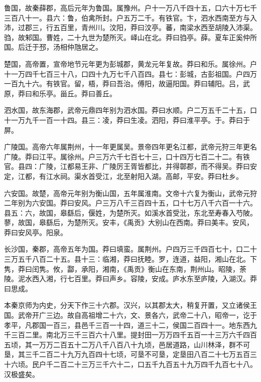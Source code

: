 \documentclass[12pt,UTF8]{ctexbook}
\begin{document}
鲁国，故秦薛郡，高后元年为鲁国。属豫州。户十一万八千四十五，口六十万七千三百八十一。县六：鲁，伯禽所封。户五万二千。有铁官。卞，泗水西南至方与入沛，过郡三，行五百里，青州川。汶阳，莽曰汶亭。蕃，南梁水西至胡陵入沛渠。驺，故邾国。曹姓，二十九世为楚所灭。峄山在北。莽曰驺亭。薛。夏车正奚仲所国。后迁于邳，汤相仲虺居之。



楚国，高帝置，宣帝地节元年更为彭城郡，黄龙元年复故。莽曰和乐。属徐州。户十一万四千七百三十八，口四十九万七千八百四。县七：彭城，古彭祖国。户四万一百九十六。有铁官。留，梧，莽曰吾治。傅阳，故逼阳国。莽曰辅阳。吕，武原，莽曰和乐亭。甾丘。莽曰善丘。



泗水国，故东海郡，武帝元鼎四年别为泗水国。莽曰水顺。户二万五千二十五，口十一万九千一百一十四。县三：凌，莽曰生凌。泗阳，莽曰淮平亭。于。莽曰于屏。



广陵国。高帝六年属荆州，十一年更属吴。景帝四年更名江都，武帝元狩三年更名广陵。莽曰江平。属徐州。户三万六千七百七十三，口十四万七百二十二。有铁官。县四：广陵，江都易王非、广陵厉王胥皆都比，并得鄣郡，而不得吴。莽曰安定，江都，有江水祠。渠水首受江，北至射阳入湖。高邮，平安。莽曰杜乡。



六安国。故楚，高帝元年别为衡山国，五年属淮南。文帝十六复为衡山，武帝元狩二年别为六安国。莽曰安风。户三万八千三百四十五，口十七万八千六百一十六。县五：六，故国，皋繇后，偃姓，为楚所灭。如溪水首受沘，东北至寿春入芍陂。蓼，故国，皋繇后，为楚所灭。安丰，《禹贡》大别山在西南。莽曰美丰。安风，莽曰安风亭。阳泉。



长沙国，秦郡，高帝五年为国。莽曰填蛮。属荆州。户四万三千四百七十，口二十三万五千八百二十五。县十三：临湘，莽曰抚睦。罗，连道，益阳，湘山在北。下隽，莽曰闰隽。攸，酃，承阳，湘南，《禹贡》衡山在东南，荆州山。昭陵，荼陵。泥水西入湘，行七百里。莽曰声乡。容陵，安成。庐水东至庐陵，入湖汉。莽曰思成。



本秦京师为内史，分天下作三十六郡。汉兴，以其郡太大，稍复开置，又立诸侯王国。武帝开广三边。故自高祖增二十六，文、景各六，武帝二十八，昭帝一，讫于孝平，凡郡国一百三，县邑千三百一十四，道三十二，侯国二百四十一。地东西九千三百二里。南北万三千三百六十八里。提封田一万万四千五百一十三万六千四百五顷，其一万万二百五十二万八千八百八十九顷，邑居道路，山川林泽，群不可垦，其三千二百二十九万九百四十七顷，可垦不可垦，定垦田八百二十七万五百三十六顷。民户千二百二十三万三千六十二，口五千九百五十九万四千九百七十八。汉极盛矣。
\end{document}
